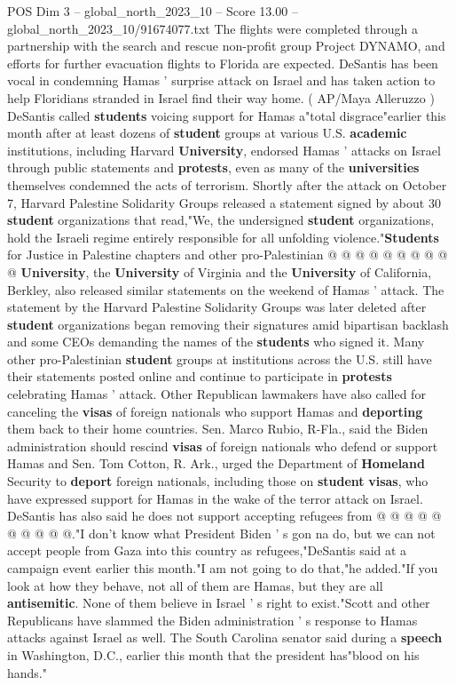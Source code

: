 \begin{textsample}{POS Dim 3 – global\_north\_2023\_10 – Score 13.00 – global\_north\_2023\_10/91674077.txt}
The flights were completed through a partnership with the search and rescue non-profit group Project DYNAMO, and efforts for further evacuation flights to Florida are expected.
DeSantis has been vocal in condemning Hamas ' surprise attack on Israel and has taken action to help Floridians stranded in Israel find their way home. ( AP/Maya Alleruzzo ) DeSantis called \textbf{students} voicing support for Hamas a"total disgrace"earlier this month after at least dozens of \textbf{student} groups at various U.S. \textbf{academic} institutions, including Harvard \textbf{University}, endorsed Hamas ' attacks on Israel through public statements and \textbf{protests}, even as many of the \textbf{universities} themselves condemned the acts of terrorism.
Shortly after the attack on October 7, Harvard Palestine Solidarity Groups released a statement signed by about 30 \textbf{student} organizations that read,"We, the undersigned \textbf{student} organizations, hold the Israeli regime entirely responsible for all unfolding violence."\textbf{Students} for Justice in Palestine chapters and other pro-Palestinian @ @ @ @ @ @ @ @ @ @ \textbf{University}, the \textbf{University} of Virginia and the \textbf{University} of California, Berkley, also released similar statements on the weekend of Hamas ' attack.
The statement by the Harvard Palestine Solidarity Groups was later deleted after \textbf{student} organizations began removing their signatures amid bipartisan backlash and some CEOs demanding the names of the \textbf{students} who signed it.
Many other pro-Palestinian \textbf{student} groups at institutions across the U.S. still have their statements posted online and continue to participate in \textbf{protests} celebrating Hamas ' attack.
Other Republican lawmakers have also called for canceling the \textbf{visas} of foreign nationals who support Hamas and \textbf{deporting} them back to their home countries.
Sen.
Marco Rubio, R-Fla., said the Biden administration should rescind \textbf{visas} of foreign nationals who defend or support Hamas and Sen.
Tom Cotton, R.
Ark., urged the Department of \textbf{Homeland} Security to \textbf{deport} foreign nationals, including those on \textbf{student} \textbf{visas}, who have expressed support for Hamas in the wake of the terror attack on Israel.
DeSantis has also said he does not support accepting refugees from @ @ @ @ @ @ @ @ @ @."I don't know what President Biden ' s gon na do, but we can not accept people from Gaza into this country as refugees,"DeSantis said at a campaign event earlier this month."I am not going to do that,"he added."If you look at how they behave, not all of them are Hamas, but they are all \textbf{antisemitic}.
None of them believe in Israel ' s right to exist."Scott and other Republicans have slammed the Biden administration ' s response to Hamas attacks against Israel as well.
The South Carolina senator said during a \textbf{speech} in Washington, D.C., earlier this month that the president has"blood on his hands."

\end{textsample}
